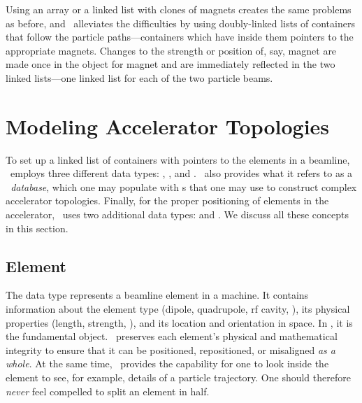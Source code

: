 %
Using an array or a linked list with clones of magnets creates
the same problems as before, and \PTC\ alleviates the difficulties
by using doubly-linked lists%
of containers that follow the particle
paths---containers which have inside them pointers to the appropriate
magnets. Changes to the strength or position of, say, magnet
 are made once in the object for magnet  and
are immediately reflected in the two linked lists---one linked list
for each of the two particle beams.


\section{Modeling Accelerator Topologies}
\label{sec:accel.topo}

%
%
To set up a linked list of containers with pointers to the elements
in a beamline, \PTC\ employs three different data types:
, , and .
\PTC\ also provides what it refers to as a \emph{\DNA\ database},
which one may populate with s that one may use to
construct complex accelerator topologies. Finally, for the proper
positioning of elements in the accelerator, \PTC\ uses two additional
data types:  and . We discuss all these
concepts in this section.


\subsection{Element}

%
The data type  represents a beamline element in a
machine. It contains information about the element type (dipole,
quadrupole, rf cavity, \etc), its physical properties (length,
strength, \etc), and its location and orientation in space.  In
\PTC, it is the fundamental object. \PTC\ preserves each element's
physical and mathematical integrity to ensure that it can be
positioned, repositioned, or misaligned \emph{as a whole}. At the
same time, \PTC\ provides the capability for one to look inside the
element to see, for example, details of a particle trajectory. One
should therefore \emph{never} feel compelled to split an element in
half.

